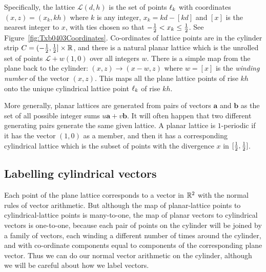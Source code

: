 
\newcommand{\dk}{x_k}\newcommand{\dm}{x_m}\newcommand{\dn}{x_n}\newcommand{\dmn}{x_{m+n}}
Specifically, the lattice  $\mathcal{L}(d,h)$ is the set of points  $\ell_{{k}}$ with coordinates  $(x,z)=(\dk,kh)$ where $k$
is any integer, $\dk=kd-[kd]$ and $[x]$ is the nearest integer to $x$, with ties chosen so that $-\jhalf < \dk \leq \jhalf$.%
See Figure~\ref{fig:Txb0403Coordinates}. 
Co-ordinates of lattice points are in the cylinder strip $C=(-\textstyle{\frac{1}{2}},\textstyle{\frac{1}{2}}]\times\mathbb{R}$, and there is a natural 
{planar lattice}  which is the unrolled set of points $\mathcal{L}+w (1,0)$ over all integers $w$. 
There is a simple map from the plane back to the cylinder: $(x,z)\rightarrow(x-w,z)$ where $w=[x]$ is the \emph{winding number} of the vector $(x,z)$. This maps all the plane lattice points of rise $kh$ onto the unique cylindrical lattice point $\ell_{{k}}$ of rise $kh$. 

More generally, planar lattices are generated from pairs of vectors $\mathbf{a}$ and $\mathbf{b}$ as the set of all possible integer sums  $u \mathbf{a}+ v\mathbf{b}$. It will often happen that two different generating pairs generate the same given lattice. A planar lattice is $1$-periodic if it has the vector $(1,0)$ as a member, and then it has a corresponding cylindrical lattice which is the subset of points with the divergence $x$ in $[\textstyle{\frac{1}{2}},\textstyle{\frac{1}{2}}]$.  

\subsection{Labelling cylindrical vectors}
Each point of the plane lattice corresponds to a 
vector in $\mathbb{R}^2$ with the normal rules of vector arithmetic. But although the map of planar-lattice points to cylindrical-lattice points is many-to-one, the map of planar vectors to cylindrical vectors is one-to-one, because each pair of points on the cylinder will be joined by a family of vectors, each winding a different number of times around the cylinder, and with co-ordinate components equal to components of the corresponding plane vector.   Thus we can do our normal vector arithmetic on the cylinder, although we will  be careful about how we label vectors. 

